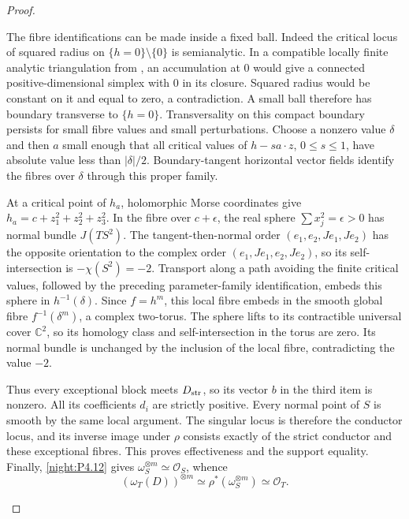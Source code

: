 \begin{proof}
\begin{enumerate}[label=\arabic*.,leftmargin=*]
The fibre identifications can be made inside a fixed ball.
Indeed the critical locus of squared radius on
$\{h=0\}\setminus\{0\}$ is semianalytic. In a compatible locally
finite analytic triangulation from
\cite[Theorem~2, p.~464]{Lojasiewicz1964}, an accumulation at $0$
would give a connected positive-dimensional simplex with $0$
in its closure. Squared radius would be constant on it and
equal to zero, a contradiction. A small ball therefore has
boundary transverse to $\{h=0\}$. Transversality on this compact
boundary persists for small fibre values and small perturbations.
Choose a nonzero value $\delta$ and then $a$ small enough that
all critical values of $h-sa\cdot z$, $0\le s\le1$, have
absolute value less than $|\delta|/2$. Boundary-tangent
horizontal vector fields identify the fibres over $\delta$
through this proper family.

At a critical point of $h_a$, holomorphic Morse coordinates give
$h_a=c+z_1^2+z_2^2+z_3^2$. In the fibre over $c+\epsilon$,
the real sphere $\sum x_j^2=\epsilon>0$ has normal bundle
$J(TS^2)$. The tangent-then-normal order
$(e_1,e_2,Je_1,Je_2)$ has the opposite orientation to the
complex order $(e_1,Je_1,e_2,Je_2)$, so its self-intersection
is $-\chi(S^2)=-2$. Transport along a path avoiding the finite
critical values, followed by the preceding parameter-family
identification, embeds this sphere in $h^{-1}(\delta)$.
Since $f=h^m$, this local fibre embeds in the smooth global
fibre $f^{-1}(\delta^m)$, a complex two-torus. The sphere lifts
to its contractible universal cover $\mathbb C^2$, so its
homology class and self-intersection in the torus are zero.
Its normal bundle is unchanged by the inclusion of the local
fibre, contradicting the value $-2$.

Thus every exceptional block meets $D_{\rm str}$, so its vector
$b$ in the third item is nonzero. All its coefficients $d_i$
are strictly positive. Every normal point of $S$ is smooth by
the same local argument. The singular locus is therefore the
conductor locus, and its inverse image under $\rho$ consists
exactly of the strict conductor and these exceptional fibres.
This proves effectiveness and the support equality.
Finally, \cref{night:P4.12} gives $\omega_S^{\otimes m}\simeq
\mathcal O_S$, whence
\[
 (\omega_T(D))^{\otimes m}
   \simeq\rho^*(\omega_S^{\otimes m})\simeq\mathcal O_T.
\]
\end{enumerate}
\end{proof}